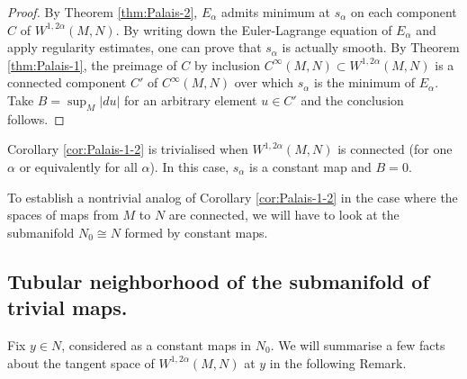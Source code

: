 \begin{proof}
By Theorem \ref{thm:Palais-2}, \(E_\alpha\) admits minimum at \(s_\alpha\) on each
component \(C\) of \(W^{1,2\alpha}(M,N)\). By writing down the Euler-Lagrange equation
of \(E_\alpha\) and apply regularity estimates, one can prove that \(s_\alpha\) is
actually smooth. By Theorem \ref{thm:Palais-1}, the preimage of \(C\) by inclusion \(C^\infty(M,N)\subset W^{1,2\alpha}(M,N)\) is a connected component \(C'\) of \(C^\infty(M,N)\) over which \(s_\alpha\)
is the minimum of \(E_\alpha\). Take \(B = \sup_M |du|\) for an arbitrary element \(u\in C'\) and the conclusion follows.
\end{proof}

\begin{remark}
Corollary \ref{cor:Palais-1-2} is trivialised when \(W^{1,2\alpha}(M,N)\) is connected
(for one \(\alpha\) or equivalently for all \(\alpha\)). In
this case, \(s_\alpha\) is a constant map and \(B=0\).
\end{remark}

To establish a nontrivial analog of Corollary \ref{cor:Palais-1-2} in the case where the
spaces of maps from \(M\) to \(N\) are connected, we will have to look at the
submanifold \(N_0\cong N\) formed by constant maps.

\subsection{Tubular neighborhood of the submanifold of trivial maps.}
\label{sec:org6af512b}

Fix \(y\in N\), considered as a constant maps in \(N_0\). We will summarise a few
facts about the tangent space of \(W^{1,2\alpha}(M,N)\) at \(y\) in the following Remark. 


